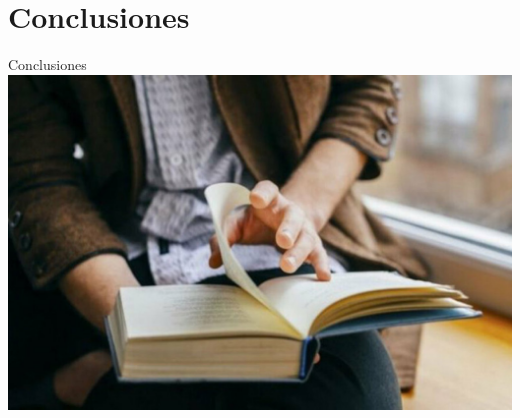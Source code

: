 \section{Conclusiones}
\begin{frame}{Conclusiones}
    \centering
    \includegraphics[scale=0.2]{images/ima12.jpg}
\end{frame}